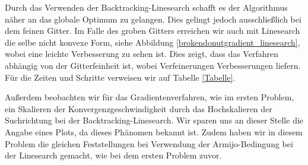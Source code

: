 Durch das Verwenden der Backtracking-Linesearch schafft es der Algorithmus näher an das globale Optimum zu gelangen. Dies gelingt jedoch ausschließlich bei dem feinen Gitter. Im Falle des groben Gitters erreichen wir auch mit Linesearch die selbe nicht konvexe Form, siehe Abbildung \ref{brokendonutgradient_linesearch}, wobei eine leichte Verbesserung zu sehen ist. Dies zeigt, dass das Verfahren abhängig von der Gitterfeinheit ist, wobei Verfeinerungen Verbesserungen liefern. Für die Zeiten und Schritte verweisen wir auf Tabelle \ref{Tabelle}.

Außerdem beobachten wir für das Gradientenverfahren, wie im ersten Problem, ein Skalieren der Konvergenzgeschwindigkeit durch das Hochskalieren der Suchrichtung bei der Backtracking-Linesearch. Wir sparen uns an dieser Stelle die Angabe eines Plots, da dieses Phänomen bekannt ist.
Zudem haben wir in diesem Problem die gleichen Feststellungen bei Verwendung der Armijo-Bedingung bei der Linesearch gemacht, wie bei dem ersten Problem zuvor.

